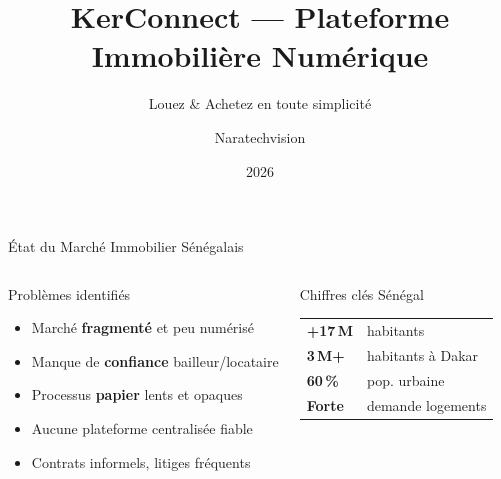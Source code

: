 ﻿\documentclass[aspectratio=169,10pt]{beamer}
\title[KerConnect]{\textbf{KerConnect} --- Plateforme Immobili\`{e}re Num\'{e}rique}
\subtitle{Louez \& Achetez en toute simplicit\'{e}}
\author{Naratechvision}
\institute{contact@naratechvision.com}
\date{2026}
\newcommand{\kcbold}[1]{\textcolor{kcCoral}{\textbf{#1}}}
\begin{document}
\begin{frame}[plain]
\end{frame}

\begin{frame}{\'{E}tat du March\'{e} Immobilier S\'{e}n\'{e}galais}
\begin{columns}[T]
\begin{alertblock}{Probl\`{e}mes identifi\'{e}s}
\begin{itemize}
\item March\'{e} \textbf{fragment\'{e}} et peu num\'{e}ris\'{e}
\item Manque de \textbf{confiance} bailleur/locataire
\item Processus \textbf{papier} lents et opaques
\item Aucune plateforme centralis\'{e}e fiable
\item Contrats informels, litiges fr\'{e}quents
\end{itemize}
\end{alertblock}
\begin{block}{Chiffres cl\'{e}s S\'{e}n\'{e}gal}
\begin{center}
\begin{tabular}{ll}
\toprule
\kcbold{+17\,M} & habitants \\
\kcbold{3\,M+}  & habitants \`{a} Dakar \\
\kcbold{60\,\%} & pop. urbaine \\
\kcbold{Forte}  & demande logements \\
\bottomrule
\end{tabular}
\end{center}
\end{block}
\end{columns}
\end{frame}
\end{document}
